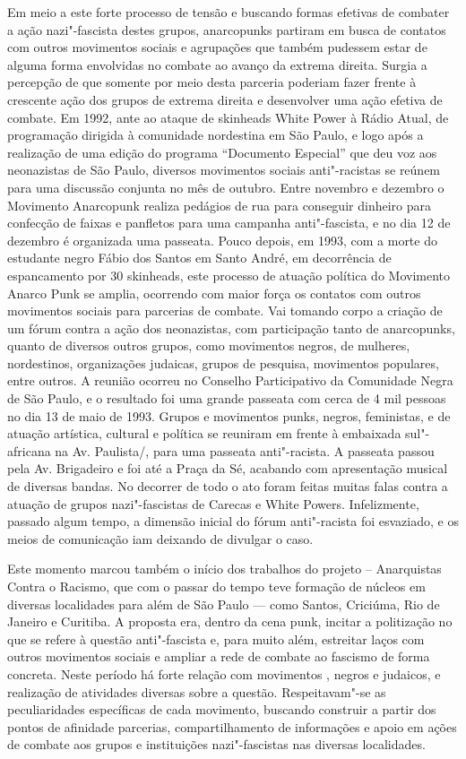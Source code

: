 Em meio a este forte processo de tensão e buscando formas efetivas de combater a ação nazi"-fascista destes grupos, anarcopunks partiram em busca de contatos com outros movimentos sociais e agrupações que também pudessem estar de alguma forma envolvidas no combate ao avanço da extrema direita. Surgia a percepção de que somente por meio desta parceria poderiam fazer frente à crescente ação dos grupos de extrema direita e desenvolver uma ação efetiva de combate. Em 1992, ante ao ataque de skinheads White Power à Rádio Atual, de programação dirigida à comunidade nordestina em São Paulo, e logo após a realização de uma edição do programa ``Documento Especial'' que deu voz aos neonazistas de São Paulo, diversos movimentos sociais anti"-racistas se reúnem para uma discussão conjunta no mês de outubro. Entre novembro e dezembro o Movimento Anarcopunk realiza pedágios de rua para conseguir dinheiro para confecção de faixas e panfletos para uma campanha anti"-fascista, e no dia 12 de dezembro é organizada uma passeata. Pouco depois, em 1993, com a morte do estudante negro Fábio dos Santos em Santo André, em decorrência de espancamento por 30 skinheads, este processo de atuação política do Movimento Anarco Punk se amplia, ocorrendo com maior força os contatos com outros movimentos sociais para parcerias de combate. Vai tomando corpo a criação de um fórum contra a ação dos neonazistas, com participação tanto de anarcopunks, quanto de diversos outros grupos, como movimentos negros, de mulheres, nordestinos, organizações judaicas, grupos de pesquisa, movimentos populares, entre outros. A reunião ocorreu no Conselho Participativo da Comunidade Negra de São Paulo, e o resultado foi uma grande passeata com cerca de 4 mil pessoas no dia 13 de maio de 1993. Grupos e movimentos punks, negros, feministas, e de atuação artística, cultural e política se reuniram em frente à embaixada sul"-africana na Av. Paulista/, para uma passeata anti"-racista. A passeata passou pela Av. Brigadeiro e foi até a Praça da Sé, acabando com apresentação musical de diversas bandas.  No decorrer de todo o ato foram feitas muitas falas contra a atuação de grupos nazi"-fascistas de Carecas e White Powers. Infelizmente, passado algum tempo, a dimensão inicial do fórum anti"-racista foi esvaziado, e os meios de comunicação iam deixando de divulgar o caso.

Este momento marcou também o início dos trabalhos do projeto  -- Anarquistas Contra o Racismo, que com o passar do tempo teve formação  de núcleos em diversas localidades para além de São Paulo --- como Santos, Criciúma, Rio de Janeiro e Curitiba. A proposta era, dentro da cena punk, incitar a politização no que se refere à questão anti"-fascista e, para muito além, estreitar laços com outros movimentos sociais e ampliar a rede de combate ao fascismo de forma concreta. Neste período há forte relação com movimentos , negros e judaicos, e realização de atividades diversas sobre a questão. Respeitavam"-se as peculiaridades específicas de cada movimento, buscando construir a partir dos pontos de afinidade parcerias, compartilhamento de informações e apoio em ações de combate aos grupos e instituições nazi"-fascistas nas diversas localidades.

